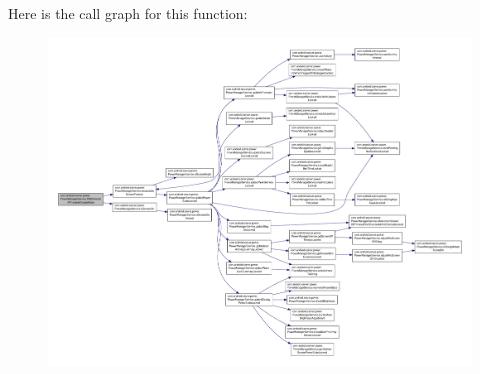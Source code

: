 Here is the call graph for this function\-:
\nopagebreak
\begin{figure}[H]
\begin{center}
\leavevmode
\includegraphics[width=350pt]{classcom_1_1android_1_1server_1_1power_1_1PowerManagerService_1_1PMSInternalAPI_ad786fda0ee177bb56ab41a7d614a1780_cgraph}
\end{center}
\end{figure}


